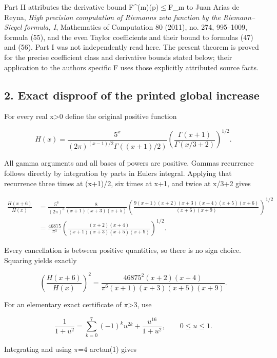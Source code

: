 Part II attributes the derivative bound \textbar F\^{}(m)(p)\textbar\ensuremath{\le}F\_m to Juan Arias de Reyna, \emph{High precision computation of Riemann\textquotesingle s zeta function by the Riemann--Siegel formula, I}, Mathematics of Computation 80 (2011), no. 274, 995--1009, formula (55), and the even Taylor coefficients and their bound to formulas (47) and (56). Part I was not independently read here. The present theorem is proved for the precise coefficient class and derivative bounds stated below; their application to the author\textquotesingle s specific F uses those explicitly attributed source facts.

\subsection{2. Exact disproof of the printed global increase}\label{aindependent:exact-disproof-of-the-printed-global-increase}

For every real x\textgreater0 define the original positive function

\[
H(x)=\frac{5^x}{(2\pi)^{(x-1)/2}\Gamma((x+1)/2)}
\left(\frac{\Gamma(x+1)}{\Gamma(x/3+2)}\right)^{1/2}.
\]

All gamma arguments and all bases of powers are positive. Gamma\textquotesingle s recurrence follows directly by integration by parts in Euler\textquotesingle s integral. Applying that recurrence three times at (x+1)/2, six times at x+1, and twice at x/3+2 gives

\[
\begin{aligned}
\frac{H(x+6)}{H(x)}
&=\frac{5^6}{(2\pi)^3}
\frac{8}{(x+1)(x+3)(x+5)}
\left(\frac{9(x+1)(x+2)(x+3)(x+4)(x+5)(x+6)}
{(x+6)(x+9)}\right)^{1/2}\\
&=\frac{46875}{\pi^3}
\left(\frac{(x+2)(x+4)}
{(x+1)(x+3)(x+5)(x+9)}\right)^{1/2}.
\end{aligned}
\]

Every cancellation is between positive quantities, so there is no sign choice. Squaring yields exactly

\[
\boxed{\left(\frac{H(x+6)}{H(x)}\right)^2
=\frac{46875^2(x+2)(x+4)}
{\pi^6(x+1)(x+3)(x+5)(x+9)}.}
\]

For an elementary exact certificate of \ensuremath{\pi}\textgreater3, use

\[
\frac1{1+u^2}=\sum_{k=0}^{7}(-1)^k u^{2k}
+\frac{u^{16}}{1+u^2},\qquad 0\le u\le1.
\]

Integrating and using \ensuremath{\pi}=4 arctan(1) gives

